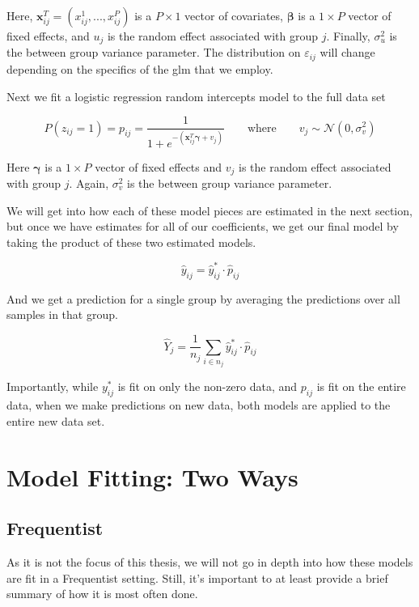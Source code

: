 \documentclass[12pt,twoside]{reedthesis}
\begin{document}
Here, \(\mathbf{x}_{ij}^T = (x^1_{ij}, ..., x^P_{ij})\) is a \(P\times 1\) vector of covariates, \(\boldsymbol{\beta}\) is a \(1\times P\) vector of fixed effects, and \(u_j\) is the random effect associated with group \(j\). Finally, \(\sigma^2_{u}\) is the between group variance parameter. The distribution on \(\varepsilon_{ij}\) will change depending on the specifics of the glm that we employ.

Next we fit a logistic regression random intercepts model to the full data set

\[
P(z_{ij} = 1) = p_{ij} = \frac{1}{1 + e^{-(\mathbf{x}_{ij}^T\boldsymbol{\gamma} + v_j)}} \qquad \text{where} \qquad v_j \sim \mathcal{N}(0, \sigma_{v}^2)
\]

Here \(\boldsymbol{\gamma}\) is a \(1\times P\) vector of fixed effects and \(v_j\) is the random effect associated with group \(j\). Again, \(\sigma^2_{v}\) is the between group variance parameter.

We will get into how each of these model pieces are estimated in the next section, but once we have estimates for all of our coefficients, we get our final model by taking the product of these two estimated models.

\[
\hat{y}_{ij} = \hat{y}^*_{ij}\cdot \hat{p}_{ij}
\]

And we get a prediction for a single group by averaging the predictions over all samples in that group.

\[
\hat{Y}_j = \frac{1}{n_j}\sum_{i \in n_j}\hat{y}^*_{ij}\cdot \hat{p}_{ij}
\]

Importantly, while \(y^*_{ij}\) is fit on only the non-zero data, and \(p_{ij}\) is fit on the entire data, when we make predictions on new data, both models are applied to the entire new data set.

\hypertarget{model-fitting-two-ways}{%
\section{Model Fitting: Two Ways}\label{model-fitting-two-ways}}

\hypertarget{frequentist}{%
\subsection{Frequentist}\label{frequentist}}

As it is not the focus of this thesis, we will not go in depth into how these models are fit in a Frequentist setting. Still, it's important to at least provide a brief summary of how it is most often done.
\end{document}

